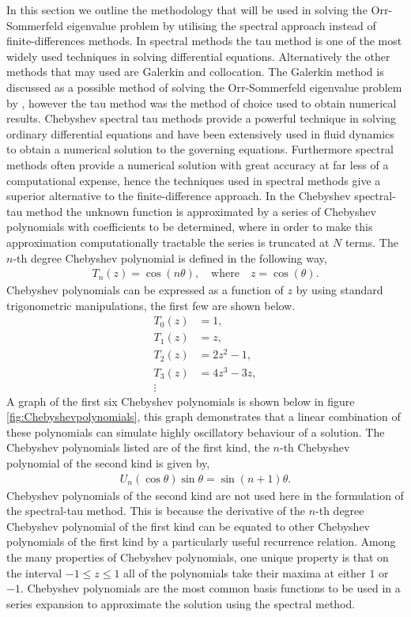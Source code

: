 \documentclass[a4paper, 12pt, twoside, openright]{article}
\numberwithin{equation}{section}
\begin{document}
In this section we outline the methodology that will be used in solving the Orr-Sommerfeld eigenvalue problem by utilising the spectral approach instead of finite-differences methods. In spectral methods the tau method is one of the most widely used techniques in solving differential equations. Alternatively the other methods that may used are Galerkin and collocation. The Galerkin method is discussed as a possible method of solving the Orr-Sommerfeld eigenvalue problem by \cite{Orszag71}, however the tau method was the method of choice used to obtain numerical results. Chebyshev spectral tau methods provide a powerful technique in solving ordinary differential equations and have been extensively used in fluid dynamics to obtain a numerical solution to the governing equations. Furthermore spectral methods often provide a numerical solution with great accuracy at far less of a computational expense, hence the techniques used in spectral methods give a superior alternative to the finite-difference approach. In the Chebyshev spectral-tau method the unknown function is approximated by a series of Chebyshev polynomials with coefficients to be determined, where in order to make this approximation computationally tractable the series is truncated at $N$ terms. The $n$-th degree Chebyshev polynomial is defined in the following way,
\begin{align}
T_n(z) = \cos(n\theta), \quad \mathrm{where} \quad z = \cos(\theta). 
\end{align}  
Chebyshev polynomials can be expressed as a function of $z$ by using standard trigonometric manipulations, the first few are shown below.
\begin{align*}
T_0 (z) &= 1,\\
T_1(z) &= z, \\
T_2(z) &= 2z^2 -1,\\
T_3(z)&= 4z^3-3z,\\
\vdots
\end{align*} 
A graph of the first six Chebyshev polynomials is shown below in figure \ref{fig:Chebyshevpolynomials}, this graph demonstrates that a linear combination of these polynomials can simulate highly oscillatory behaviour of a solution. The Chebyshev polynomials listed are of the first kind, the $n$-th Chebyshev polynomial of the second kind is given by,
\begin{align*}
U_n(\cos\theta)\sin\theta=\sin(n+1)\theta. 
\end{align*}
Chebyshev polynomials of the second kind are not used here in the formulation of the spectral-tau method. This is because the derivative of the $n$-th degree Chebyshev polynomial of the first kind can be equated to other Chebyshev polynomials of the first kind by a particularly useful recurrence relation. Among the many properties of Chebyshev polynomials, one unique property is that on the interval $-1\leq z \leq 1$ all of the polynomials take their maxima at either $1$ or $-1$. Chebyshev polynomials are the most common basis functions to be used in a series expansion to approximate the solution using the spectral method. 
\end{document}
